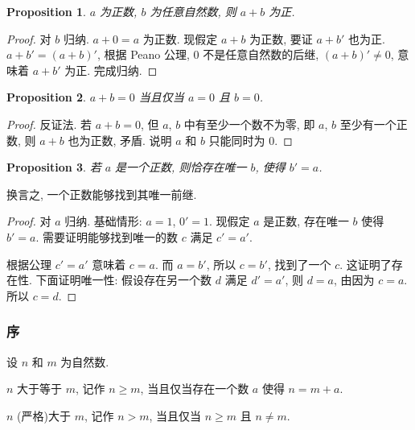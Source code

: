 \documentclass[UTF8]{ctexart}
\theoremstyle{mystyle}
\newtheorem{proposition}{Proposition}[section]
\theoremstyle{myremark}
\theoremstyle{plain}
\begin{document}
\begin{proposition}
    $ a $ 为正数, $ b $ 为任意自然数, 则 $ a + b $ 为正.
\end{proposition}

\begin{proof}
    对 $ b $ 归纳. $ a + 0 = a $ 为正数. 现假定 $ a + b $ 为正数, 要证 $ a + b' $ 也为正. $ a + b' = (a + b)' $, 根据 Peano 公理, $ 0 $ 不是任意自然数的后继, $ (a + b)' \neq 0 $, 意味着 $ a + b' $ 为正. 完成归纳. 
\end{proof}

\begin{proposition}
    $ a + b = 0 $ 当且仅当 $ a = 0 $ 且 $ b = 0 $.
\end{proposition}

\begin{proof}
    反证法. 若 $ a + b = 0 $, 但 $ a $, $ b $ 中有至少一个数不为零, 即 $ a $, $ b $ 至少有一个正数, 则 $ a + b $ 也为正数, 矛盾. 说明 $ a $ 和 $ b $ 只能同时为 $ 0 $.
\end{proof}

\begin{proposition}
    若 $ a $ 是一个正数, 则恰存在唯一 $ b $, 使得 $ b' = a $.
\end{proposition}

换言之, 一个正数能够找到其唯一前继.

\begin{proof}
    对 $ a $ 归纳. 基础情形: $ a = 1 $, $ 0' = 1 $. 现假定 $ a $ 是正数, 存在唯一 $ b $ 使得 $ b' = a $. 需要证明能够找到唯一的数 $ c $ 满足 $ c' = a' $. 
    
    根据公理 $ c' = a' $ 意味着 $ c = a $. 而 $ a = b' $, 所以 $ c = b' $, 找到了一个 $ c $. 这证明了存在性. 下面证明唯一性: 假设存在另一个数 $ d $ 满足 $ d' = a' $, 则 $ d = a $, 由因为 $ c = a $. 所以 $ c = d $.
\end{proof}

\subsubsection{序}
\begin{definition}
    设 $ n $ 和 $ m $ 为自然数. 
    
    $ n $ 大于等于 $ m $, 记作 $ n \geqslant m $, 当且仅当存在一个数 $ a $ 使得 $ n = m + a $. 
    
    $ n $ {\rm(}严格{\rm)}大于 $ m $, 记作 $ n > m $, 当且仅当 $ n \geqslant m $ 且 $ n \neq m $.
\end{definition}
\end{document}
